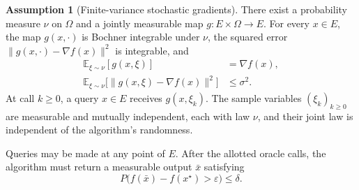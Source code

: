 \documentclass[10pt]{article}
\theoremstyle{definition}
\newtheorem{assumption}{Assumption}
\begin{document}
\begin{assumption}[Finite-variance stochastic gradients]
There exist a probability measure $\nu$ on $\Omega$ and a jointly measurable map $g:E\times\Omega\to E$. For every $x\in E$, the map $g(x,\cdot)$ is Bochner integrable under $\nu$, the squared error $\|g(x,\cdot)-\nabla f(x)\|^2$ is integrable, and
\[
\begin{aligned}
\mathbb{E}_{\xi\sim\nu}[g(x,\xi)]&=\nabla f(x),\\
\mathbb{E}_{\xi\sim\nu}
\bigl[\|g(x,\xi)-\nabla f(x)\|^2\bigr]&\leq\sigma^2.
\end{aligned}
\]
At call $k\geq0$, a query $x\in E$ receives $g(x,\xi_k)$. The sample variables $(\xi_k)_{k\geq0}$ are measurable and mutually independent, each with law $\nu$, and their joint law is independent of the algorithm's randomness.
\end{assumption}

Queries may be made at any point of $E$. After the allotted oracle calls, the algorithm must return a measurable output $\bar{x}$ satisfying
\[
P\bigl(f(\bar{x})-f(x^\star)>\varepsilon\bigr)\leq\delta.
\]
\end{document}
